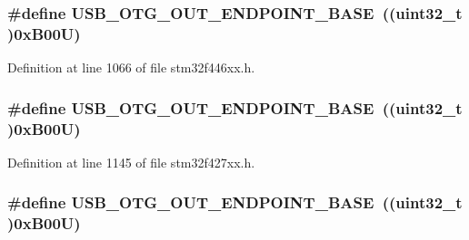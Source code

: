 \subsubsection[{\texorpdfstring{U\+S\+B\+\_\+\+O\+T\+G\+\_\+\+O\+U\+T\+\_\+\+E\+N\+D\+P\+O\+I\+N\+T\+\_\+\+B\+A\+SE}{USB_OTG_OUT_ENDPOINT_BASE}}]{\setlength{\rightskip}{0pt plus 5cm}\#define U\+S\+B\+\_\+\+O\+T\+G\+\_\+\+O\+U\+T\+\_\+\+E\+N\+D\+P\+O\+I\+N\+T\+\_\+\+B\+A\+SE~((uint32\+\_\+t )0x\+B00\+U)}\hypertarget{group___peripheral__memory__map_gaf0e972b8f028ecf44a652029efbd4642}{}\label{group___peripheral__memory__map_gaf0e972b8f028ecf44a652029efbd4642}


Definition at line 1066 of file stm32f446xx.\+h.

\subsubsection[{\texorpdfstring{U\+S\+B\+\_\+\+O\+T\+G\+\_\+\+O\+U\+T\+\_\+\+E\+N\+D\+P\+O\+I\+N\+T\+\_\+\+B\+A\+SE}{USB_OTG_OUT_ENDPOINT_BASE}}]{\setlength{\rightskip}{0pt plus 5cm}\#define U\+S\+B\+\_\+\+O\+T\+G\+\_\+\+O\+U\+T\+\_\+\+E\+N\+D\+P\+O\+I\+N\+T\+\_\+\+B\+A\+SE~((uint32\+\_\+t )0x\+B00\+U)}\hypertarget{group___peripheral__memory__map_gaf0e972b8f028ecf44a652029efbd4642}{}\label{group___peripheral__memory__map_gaf0e972b8f028ecf44a652029efbd4642}


Definition at line 1145 of file stm32f427xx.\+h.

\subsubsection[{\texorpdfstring{U\+S\+B\+\_\+\+O\+T\+G\+\_\+\+O\+U\+T\+\_\+\+E\+N\+D\+P\+O\+I\+N\+T\+\_\+\+B\+A\+SE}{USB_OTG_OUT_ENDPOINT_BASE}}]{\setlength{\rightskip}{0pt plus 5cm}\#define U\+S\+B\+\_\+\+O\+T\+G\+\_\+\+O\+U\+T\+\_\+\+E\+N\+D\+P\+O\+I\+N\+T\+\_\+\+B\+A\+SE~((uint32\+\_\+t )0x\+B00\+U)}\hypertarget{group___peripheral__memory__map_gaf0e972b8f028ecf44a652029efbd4642}{}\label{group___peripheral__memory__map_gaf0e972b8f028ecf44a652029efbd4642}


